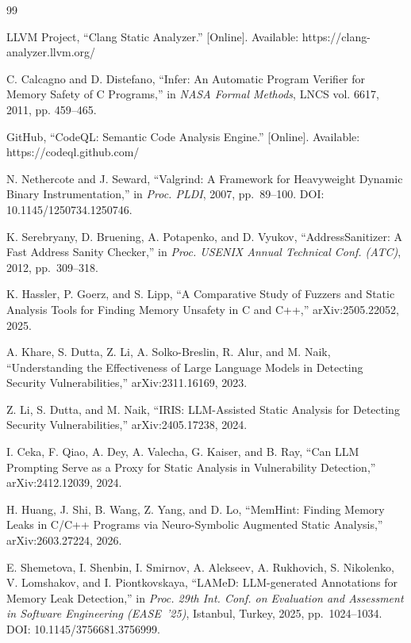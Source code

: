 \documentclass[a4paper]{llncs}
\begin{document}
\footnotesize
\begin{thebibliography}{99}

 LLVM Project, ``Clang Static Analyzer.'' [Online]. Available: https://clang-analyzer.llvm.org/

 C. Calcagno and D. Distefano, ``Infer: An Automatic Program Verifier for Memory Safety of C Programs,'' in \textit{NASA Formal Methods}, LNCS vol. 6617, 2011, pp. 459--465.

 GitHub, ``CodeQL: Semantic Code Analysis Engine.'' [Online]. Available: https://codeql.github.com/

 N. Nethercote and J. Seward, ``Valgrind: A Framework for Heavyweight Dynamic Binary Instrumentation,'' in \textit{Proc. PLDI}, 2007, pp.~89--100. DOI: 10.1145/1250734.1250746.

 K. Serebryany, D. Bruening, A. Potapenko, and D. Vyukov, ``AddressSanitizer: A Fast Address Sanity Checker,'' in \textit{Proc. USENIX Annual Technical Conf. (ATC)}, 2012, pp.~309--318.

 K. Hassler, P. Goerz, and S. Lipp, ``A Comparative Study of Fuzzers and Static Analysis Tools for Finding Memory Unsafety in C and C++,'' arXiv:2505.22052, 2025.

 A. Khare, S. Dutta, Z. Li, A. Solko-Breslin, R. Alur, and M. Naik, ``Understanding the Effectiveness of Large Language Models in Detecting Security Vulnerabilities,'' arXiv:2311.16169, 2023.

 Z. Li, S. Dutta, and M. Naik, ``IRIS: LLM-Assisted Static Analysis for Detecting Security Vulnerabilities,'' arXiv:2405.17238, 2024.

 I. Ceka, F. Qiao, A. Dey, A. Valecha, G. Kaiser, and B. Ray, ``Can LLM Prompting Serve as a Proxy for Static Analysis in Vulnerability Detection,'' arXiv:2412.12039, 2024.

 H. Huang, J. Shi, B. Wang, Z. Yang, and D. Lo, ``MemHint: Finding Memory Leaks in C/C++ Programs via Neuro-Symbolic Augmented Static Analysis,'' arXiv:2603.27224, 2026.

 E. Shemetova, I. Shenbin, I. Smirnov, A. Alekseev, A. Rukhovich, S. Nikolenko, V. Lomshakov, and I. Piontkovskaya, ``LAMeD: LLM-generated Annotations for Memory Leak Detection,'' in \textit{Proc. 29th Int. Conf. on Evaluation and Assessment in Software Engineering (EASE~'25)}, Istanbul, Turkey, 2025, pp.~1024--1034. DOI: 10.1145/3756681.3756999.


\end{thebibliography}
\end{document}
